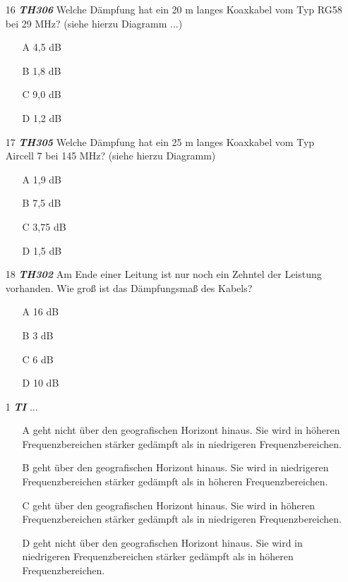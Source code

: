 \begin{enumerate} 
\itemsep1pt\parskip0pt
\item[16] \emph{\textbf{TH306}}  Welche Dämpfung hat ein 20 m langes Koaxkabel vom Typ RG58 bei 29 MHz? (siehe hierzu Diagramm ...)
	\begin{enumerate}
	\itemsep1pt\parskip0pt
		\item[A] 4,5 dB
		\item[B] 1,8 dB
		\item[C] 9,0 dB
		\item[D] 1,2 dB
	\end{enumerate}
\item[17] \emph{\textbf{TH305}}  Welche Dämpfung hat ein 25 m langes Koaxkabel vom Typ Aircell 7 bei 145 MHz? (siehe hierzu Diagramm)
	\begin{enumerate}
	\itemsep1pt\parskip0pt
		\item[A] 1,9 dB
		\item[B] 7,5 dB
		\item[C] 3,75 dB
		\item[D] 1,5 dB
	\end{enumerate}
\item[18] \emph{\textbf{TH302}}  Am Ende einer Leitung ist nur noch ein Zehntel der Leistung vorhanden. Wie groß ist das Dämpfungsmaß des Kabels?
	\begin{enumerate}
	\itemsep1pt\parskip0pt
		\item[A] 16 dB
		\item[B] 3 dB
		\item[C] 6 dB
		\item[D] 10 dB
	\end{enumerate}
\end{enumerate}



\begin{enumerate} 
\itemsep1pt\parskip0pt
\item[1] \emph{\textbf{TI}}  ...
	\begin{enumerate}
	\itemsep1pt\parskip0pt
		\item[A] geht nicht über den geografischen Horizont hinaus. Sie wird in höheren Frequenzbereichen stärker gedämpft als in niedrigeren Frequenzbereichen.
		\item[B] geht über den geografischen Horizont hinaus. Sie wird in niedrigeren Frequenzbereichen stärker gedämpft als in höheren Frequenzbereichen.
		\item[C] geht über den geografischen Horizont hinaus. Sie wird in höheren Frequenzbereichen stärker gedämpft als in niedrigeren Frequenzbereichen.
		\item[D] geht nicht über den geografischen Horizont hinaus. Sie wird in niedrigeren Frequenzbereichen stärker gedämpft als in höheren Frequenzbereichen.
	\end{enumerate}
\end{enumerate}